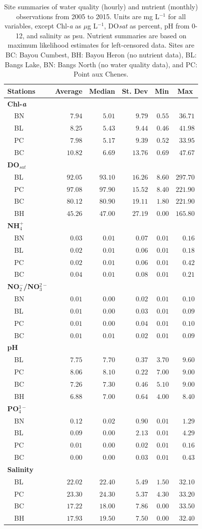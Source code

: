 \documentclass[letterpaper,12pt]{article}\usepackage[]{graphicx}\usepackage[]{color}
\begin{document}
\begin{table}[!tbp]
\caption{Site summaries of water quality (hourly) and nutrient (monthly) observations from 2005 to 2015.  Units are mg L$^{-1}$ for all variables, except Chl-\textit{a} as $\mu$g L$^{-1}$, DO\textit{sat} as percent, pH from 0-12, and salinity as psu. Nutrient summaries are based on maximum likelihood estimates for left-censored data.  Sites are BC: Bayou Cumbest, BH: Bayou Heron (no nutrient data), BL: Bangs Lake, BN: Bangs North (no water quality data), and PC: Point aux Chenes.\label{tab:summtab}} 
\begin{center}
\begin{tabular}{lrrrrr}
\hline\hline
\multicolumn{1}{l}{Stations}&\multicolumn{1}{c}{Average}&\multicolumn{1}{c}{Median}&\multicolumn{1}{c}{St. Dev}&\multicolumn{1}{c}{Min}&\multicolumn{1}{c}{Max}\tabularnewline
\hline
{\bfseries Chl-\textit{a}}&&&&&\tabularnewline
~~BN&$ 7.94$&$ 5.01$&$ 9.79$&$0.55$&$ 36.71$\tabularnewline
~~BL&$ 8.25$&$ 5.43$&$ 9.44$&$0.46$&$ 41.98$\tabularnewline
~~PC&$ 7.98$&$ 5.17$&$ 9.39$&$0.52$&$ 33.95$\tabularnewline
~~BC&$10.82$&$ 6.69$&$13.76$&$0.69$&$ 47.67$\tabularnewline
\hline
{\bfseries DO$_{sat}$}&&&&&\tabularnewline
~~BL&$92.05$&$93.10$&$16.26$&$8.60$&$297.70$\tabularnewline
~~PC&$97.08$&$97.90$&$15.52$&$8.40$&$221.90$\tabularnewline
~~BC&$80.12$&$80.90$&$19.11$&$1.80$&$221.90$\tabularnewline
~~BH&$45.26$&$47.00$&$27.19$&$0.00$&$165.80$\tabularnewline
\hline
{\bfseries NH$_4^+$}&&&&&\tabularnewline
~~BN&$ 0.03$&$ 0.01$&$ 0.07$&$0.01$&$  0.16$\tabularnewline
~~BL&$ 0.02$&$ 0.01$&$ 0.06$&$0.01$&$  0.18$\tabularnewline
~~PC&$ 0.02$&$ 0.01$&$ 0.06$&$0.01$&$  0.42$\tabularnewline
~~BC&$ 0.04$&$ 0.01$&$ 0.08$&$0.01$&$  0.21$\tabularnewline
\hline
{\bfseries NO$_2^-$/NO$_3^{2-}$}&&&&&\tabularnewline
~~BN&$ 0.01$&$ 0.00$&$ 0.02$&$0.01$&$  0.10$\tabularnewline
~~BL&$ 0.01$&$ 0.00$&$ 0.03$&$0.01$&$  0.09$\tabularnewline
~~PC&$ 0.01$&$ 0.00$&$ 0.04$&$0.01$&$  0.10$\tabularnewline
~~BC&$ 0.01$&$ 0.01$&$ 0.02$&$0.01$&$  0.09$\tabularnewline
\hline
{\bfseries pH}&&&&&\tabularnewline
~~BL&$ 7.75$&$ 7.70$&$ 0.37$&$3.70$&$  9.60$\tabularnewline
~~PC&$ 8.06$&$ 8.10$&$ 0.22$&$7.00$&$  9.00$\tabularnewline
~~BC&$ 7.26$&$ 7.30$&$ 0.46$&$5.10$&$  9.00$\tabularnewline
~~BH&$ 6.88$&$ 7.00$&$ 0.64$&$4.00$&$  8.40$\tabularnewline
\hline
{\bfseries PO$_4^{3-}$}&&&&&\tabularnewline
~~BN&$ 0.12$&$ 0.02$&$ 0.90$&$0.01$&$  1.29$\tabularnewline
~~BL&$ 0.09$&$ 0.00$&$ 2.13$&$0.01$&$  4.29$\tabularnewline
~~PC&$ 0.01$&$ 0.00$&$ 0.02$&$0.01$&$  0.16$\tabularnewline
~~BC&$ 0.00$&$ 0.00$&$ 0.03$&$0.01$&$  0.43$\tabularnewline
\hline
{\bfseries Salinity}&&&&&\tabularnewline
~~BL&$22.02$&$22.40$&$ 5.49$&$1.50$&$ 32.10$\tabularnewline
~~PC&$23.30$&$24.30$&$ 5.37$&$4.30$&$ 33.20$\tabularnewline
~~BC&$17.22$&$18.00$&$ 7.86$&$0.00$&$ 33.50$\tabularnewline
~~BH&$17.93$&$19.50$&$ 7.50$&$0.00$&$ 32.40$\tabularnewline
\hline
\end{tabular}\end{center}
\end{table}
\end{document}
